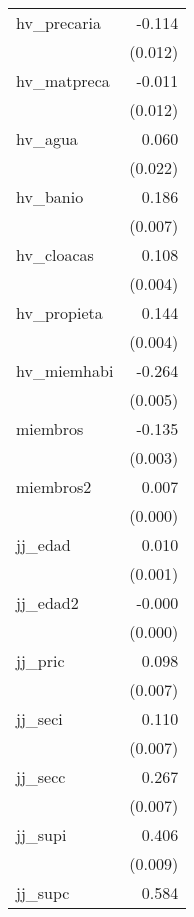 {\begin{longtable}{l*{1}{D{.}{.}{-1}}}
\addlinespace
hv\_precaria &      -0.114\sym{***}\\
            &     (0.012)         \\
\addlinespace
hv\_matpreca &      -0.011         \\
            &     (0.012)         \\
\addlinespace
hv\_agua     &       0.060\sym{**} \\
            &     (0.022)         \\
\addlinespace
hv\_banio    &       0.186\sym{***}\\
            &     (0.007)         \\
\addlinespace
hv\_cloacas  &       0.108\sym{***}\\
            &     (0.004)         \\
\addlinespace
hv\_propieta &       0.144\sym{***}\\
            &     (0.004)         \\
\addlinespace
hv\_miemhabi &      -0.264\sym{***}\\
            &     (0.005)         \\
\addlinespace
miembros    &      -0.135\sym{***}\\
            &     (0.003)         \\
\addlinespace
miembros2   &       0.007\sym{***}\\
            &     (0.000)         \\
\addlinespace
jj\_edad     &       0.010\sym{***}\\
            &     (0.001)         \\
\addlinespace
jj\_edad2    &      -0.000\sym{***}\\
            &     (0.000)         \\
\addlinespace
jj\_pric     &       0.098\sym{***}\\
            &     (0.007)         \\
\addlinespace
jj\_seci     &       0.110\sym{***}\\
            &     (0.007)         \\
\addlinespace
jj\_secc     &       0.267\sym{***}\\
            &     (0.007)         \\
\addlinespace
jj\_supi     &       0.406\sym{***}\\
            &     (0.009)         \\
\addlinespace
jj\_supc     &       0.584\sym{***}\\

\end{longtable}}
